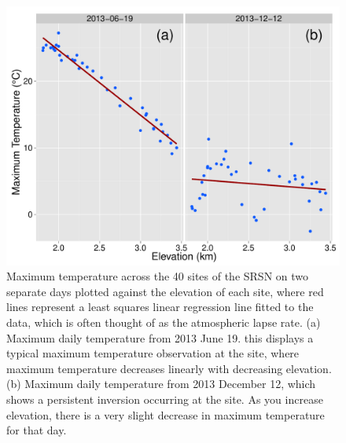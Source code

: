 \documentclass{ametsoc}
\begin{document}
\begin{figure}[ht]

\centerline{\includegraphics[width=39pc]{figure11_tmx-lapse.pdf}}

\caption{Maximum temperature across the 40 sites of the SRSN on two separate days plotted against the elevation of each site, where red lines represent a least squares linear regression line fitted to the data, which is often thought of as the atmospheric lapse rate. (a) Maximum daily temperature from 2013 June 19. this displays a typical maximum temperature observation at the site, where maximum temperature decreases linearly with decreasing elevation. (b) Maximum daily temperature from 2013 December 12, which shows a persistent inversion occurring at the site. As you increase elevation, there is a very slight decrease in maximum temperature for that day.}
\label{fig:11}
\end{figure}


\end{document}
